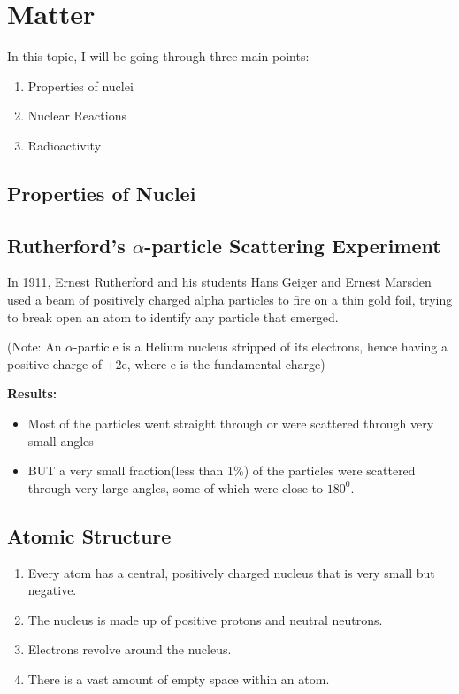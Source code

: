 \section{Matter}
 In this topic, I will be going through three main points:
 \begin{enumerate}
 \item Properties of nuclei
 \item Nuclear Reactions
 \item Radioactivity
 \end{enumerate}
 
 \subsection{Properties of Nuclei}
 \subsection*{Rutherford's $\alpha$-particle Scattering Experiment}\label{rutherford}
 In 1911, Ernest Rutherford and his students Hans Geiger and Ernest Marsden used a beam of positively charged alpha particles to fire on a thin gold foil, trying to break open an atom to identify any particle that emerged.
 
 (Note: An $\alpha$-particle is a Helium nucleus stripped of its electrons, hence having a positive charge of +2e, where e is the fundamental charge)
 
 \textbf{Results:}
 \begin{itemize}
 \item Most of the particles went straight through or were scattered through very small angles
 \item BUT a very small fraction(less than 1\%) of the particles were scattered through very large angles, some of which were close to $180^0$.
 \end{itemize}
 
 \subsection{Atomic Structure}
 \begin{enumerate}
 \item Every atom has a central, positively charged nucleus that is very small but negative.
 \item The nucleus is made up of positive protons and neutral neutrons.
 \item Electrons revolve around the nucleus.
 \item There is a vast amount of empty space within an atom.
 \end{enumerate}
 
